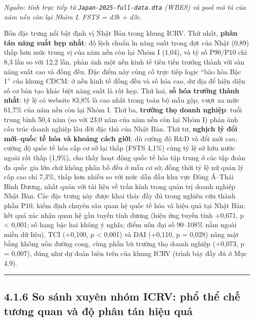 \documentclass[
  a4paper,
  13pt]{extreport}
\begin{document}
\emph{Nguồn: tính trực tiếp từ \texttt{Japan-2025-full-data.dta} (WBES)
và pool mô tả của năm nền còn lại Nhóm I. FSTS = d3b + d3c.}

Bốn đặc trưng nổi bật định vị Nhật Bản trong khung ICRV. Thứ nhất,
\textbf{phân tán năng suất hẹp nhất}: độ lệch chuẩn ln năng suất trong
đợt của Nhật (0,89) thấp hơn mức trung vị của năm nền còn lại Nhóm I
(1,04), và tỷ số P90/P10 chỉ 8,3 lần so với 12,2 lần, phản ánh một nền
kinh tế tiên tiến trưởng thành với sàn năng suất cao và đồng đều. Đặc
điểm này củng cố trực tiếp logic ``bão hòa Bậc 1'' của khung CDCM: ở nền
kinh tế đồng đều và số hóa cao, dư địa để hiện diện số cơ bản tạo khác
biệt năng suất là rất hẹp. Thứ hai, \textbf{số hóa trưởng thành nhất}:
tỷ lệ có website 83,8\% là cao nhất trong toàn bộ mẫu gộp, vượt xa mức
61,7\% của năm nền còn lại Nhóm I. Thứ ba, \textbf{trường thọ doanh
nghiệp}: tuổi trung bình 50,4 năm (so với 23,0 năm của năm nền còn lại
Nhóm I) phản ánh cấu trúc doanh nghiệp lâu đời đặc thù của Nhật Bản. Thứ
tư, \textbf{nghịch lý đổi mới--quốc tế hóa và khoảng cách giới}: dù
cường độ R\&D và đổi mới cao, cường độ quốc tế hóa cấp cơ sở lại thấp
(FSTS 4,1\%) cùng tỷ lệ sở hữu nước ngoài rất thấp (1,9\%), cho thấy
hoạt động quốc tế hóa tập trung ở các tập đoàn đa quốc gia lớn chứ không
phân bố đều ở mẫu cơ sở; đồng thời tỷ lệ nữ quản lý cấp cao chỉ 7,3\%,
thấp hơn nhiều so với mức dẫn đầu khu vực Đông Á--Thái Bình Dương, nhất
quán với tài liệu về trần kính trong quản trị doanh nghiệp Nhật Bản. Các
đặc trưng này được khai thác đầy đủ trong nghiên cứu thành phần P10,
kiểm định chuyên sâu quan hệ quốc tế hóa và hiệu quả tại Nhật Bản: kết
quả xác nhận quan hệ gần tuyến tính dương (hiệu ứng tuyến tính +0,671, p
\textless{} 0,001; số hạng bậc hai không ý nghĩa; điểm uốn đại số
90--108\% nằm ngoài miền dữ liệu), TCI (+0,100, p \textless{} 0,001) và
DAI (+0,110, p = 0,028) nâng mặt bằng không uốn đường cong, cùng phần bù
trường thọ doanh nghiệp (+0,073, p = 0,007), đúng như dự đoán biên trên
của khung ICRV (trình bày đầy đủ ở Mục 4.9).

\begin{center}\rule{0.5\linewidth}{0.5pt}\end{center}

\hypertarget{so-suxe1nh-xuyuxean-nhuxf3m-icrv-phux1ed5-thux1ec3-chux1ebf-tux1b0ux1a1ng-quan-vuxe0-ux111ux1ed9-phuxe2n-tuxe1n-hiux1ec7u-quux1ea3}{%
\subsection{4.1.6 So sánh xuyên nhóm ICRV: phổ thể chế tương quan và độ
phân tán hiệu
quả}\label{so-suxe1nh-xuyuxean-nhuxf3m-icrv-phux1ed5-thux1ec3-chux1ebf-tux1b0ux1a1ng-quan-vuxe0-ux111ux1ed9-phuxe2n-tuxe1n-hiux1ec7u-quux1ea3}}
\end{document}
